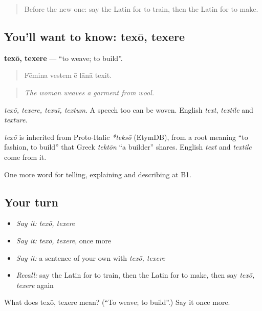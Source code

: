 \begin{quote}
Before the new one: say the Latin for to train, then the Latin for to make.
\end{quote}

\subsection*{You'll want to know: texō, texere}
\textbf{texō, texere} — \textquotedblleft{}to weave; to build\textquotedblright{}.

\begin{quote}
Fēmina vestem ē lānā texit.
\end{quote}

\begin{quote}
\emph{The woman weaves a garment from wool.}
\end{quote}

\emph{texō, texere, texuī, textum}. A speech too can be woven. English \emph{text}, \emph{textile} and \emph{texture}.

\begin{cousinweb}
\emph{texō} is inherited from Proto-Italic \emph{*teksō} (EtymDB), from a root meaning \textquotedblleft{}to fashion, to build\textquotedblright{} that Greek \emph{tektōn} \textquotedblleft{}a builder\textquotedblright{} shares. English \emph{text} and \emph{textile} come from it.
\end{cousinweb}

\begin{grammarlens}[title={What you've built}]
One more word for telling, explaining and describing at B1.
\end{grammarlens}

\subsection*{Your turn}
\begin{itemize}
\raggedright
  \item \emph{Say it:} \emph{texō, texere}
  \item \emph{Say it:} \emph{texō, texere}, once more
  \item \emph{Say it:} a sentence of your own with \emph{texō, texere}
  \item \emph{Recall:} say the Latin for to train, then the Latin for to make, then say \emph{texō, texere} again
\end{itemize}

\begin{tcolorbox}[breakable,colback=teal!4,colframe=teal!35!black,title={Before you move on}]
What does texō, texere mean? (\textquotedblleft{}To weave; to build\textquotedblright{}.) Say it once more.
\end{tcolorbox}
